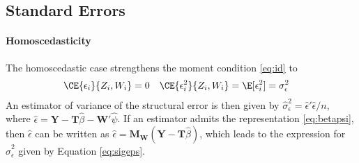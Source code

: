 \documentclass{mynotes}
\newcommand{\by}{\mathbf{Y}} %
\newcommand{\bt}{\mathbf{T}} %
\newcommand{\bw}{\mathbf{W}} %
\newcommand{\Mm}[1]{\mathbf{M}_{#1}} %
\begin{document}
\begin{appendices}
\section{Standard Errors}

\paragraph{Homoscedasticity}
The homoscedastic case strengthens the moment condition \eqref{eq:id} to
\begin{align*}
  \CE{\epsilon_{i}}{Z_{i},W_{i}}&=0&
  \CE{\epsilon_{i}^{2}}{Z_{i},W_{i}}&=\E[\epsilon^{2}_{i}]=\sigma^{2}_{\epsilon}
\end{align*}
An estimator of variance of the structural error is then given by
$\hat{\sigma}^{2}_{\epsilon}=\hat{\epsilon}'\hat{\epsilon}/n$, where
$\hat{\epsilon}=\by-\bt\hat{\beta}-\bw'\hat{\psi}$. If an estimator admits the
representation \eqref{eq:betapsi}, then $\hat{\epsilon}$ can be written as
$\hat{\epsilon}=\Mm{\bw}(\by-\bt\hat{\beta})$, which leads to the expression for
$\hat{\sigma}^{2}_{\epsilon}$ given by Equation \eqref{eq:sigeps}.


\end{appendices}
\end{document}
